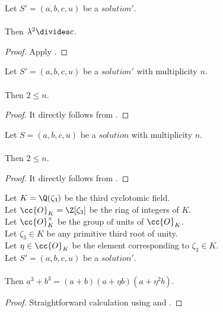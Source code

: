 \begin{lemma}
  \label{lmm:lambda_pow_two_dvd_c}
  \leanok
  Let $S'=(a, b, c, u)$ be a $solution'$. \\\\
  Then $\lambda^2 \divides c$.
\end{lemma}
\begin{proof}
  \leanok
  Apply .
\end{proof}

\begin{lemma}
  \label{lmm:Solution1_two_le_multiplicity}
  \leanok
  Let $S'=(a, b, c, u)$ be a $solution'$ with multiplicity $n$.\\\\
  Then $2 \leq n$.
\end{lemma}
\begin{proof}
  \leanok
  It directly follows from .
\end{proof}

\begin{lemma}
  \label{lmm:Solution_two_le_multiplicity}
  \leanok
  Let $S=(a, b, c, u)$ be a $solution$ with multiplicity $n$.\\\\
  Then $2 \leq n$.
\end{lemma}
\begin{proof}
  \leanok
  It directly follows from .
\end{proof}

\begin{lemma}
  \label{lmm:cube_add_cube_eq_mul}
  \leanok
  Let $K = \Q(\zeta_3)$ be the third cyclotomic field. \\
  Let $\cc{O}_K = \Z[\zeta_3]$ be the ring of integers of $K$. \\
  Let $\cc{O}^\times_K$ be the group of units of $\cc{O}_K$. \\
  Let $\zeta_3 \in K$ be any primitive third root of unity. \\
  Let $\eta \in \cc{O}_K$ be the element corresponding to $\zeta_3 \in K$. \\
  Let $S'=(a, b, c, u)$ be a $solution'$.\\\\
  Then $a^3 + b^3 = (a + b) (a + \eta b) (a + \eta^2 b)$.
\end{lemma}
\begin{proof}
  \leanok
  Straightforward calculation using 
  and .
\end{proof}

